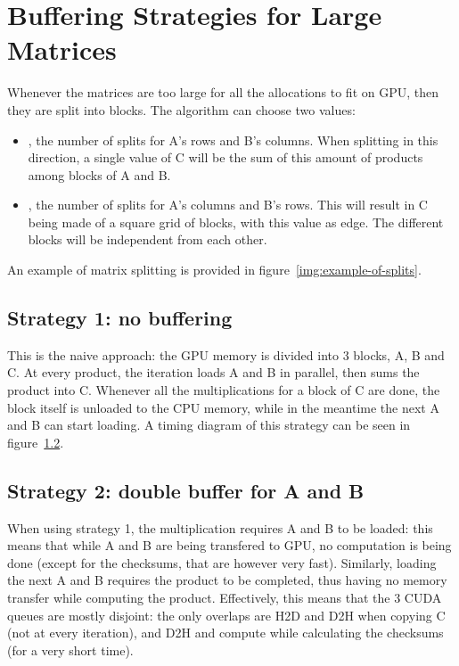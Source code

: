 \section{Buffering Strategies for Large Matrices}
\label{sec:strategies}


Whenever the matrices are too large for all the allocations to fit on GPU, then they are split into blocks.
The algorithm can choose two values:
\begin{itemize}
	\item {}, the number of splits for A's rows and B's columns. When splitting in this direction, a single value of C will be the sum of this amount of products among blocks of A and B.
	\item{}, the number of splits for A's columns and B's rows. This will result in C being made of a square grid of blocks, with this value as edge. The different blocks will be independent from each other.
\end{itemize}

An example of matrix splitting is provided in figure~\ref{img:example-of-splits}.


\subsection{Strategy 1: no buffering}

This is the naive approach: the GPU memory is divided into 3 blocks, A, B and C.
At every product, the iteration loads A and B in parallel, then sums the product into C.
Whenever all the multiplications for a block of C are done, the block itself is unloaded to the CPU memory, while in the meantime the next A and B can start loading.
A timing diagram of this strategy can be seen in figure~\ref{}.

\subsection{Strategy 2: double buffer for A and B}

When using strategy 1, the multiplication requires A and B to be loaded: this means that while A and B are being transfered to GPU, no computation is being done (except for the checksums, that are however very fast).
Similarly, loading the next A and B requires the product to be completed, thus having no memory transfer while computing the product.
Effectively, this means that the 3 CUDA queues are mostly disjoint: the only overlaps are H2D and D2H when copying C (not at every iteration), and D2H and compute while calculating the checksums (for a very short time).


